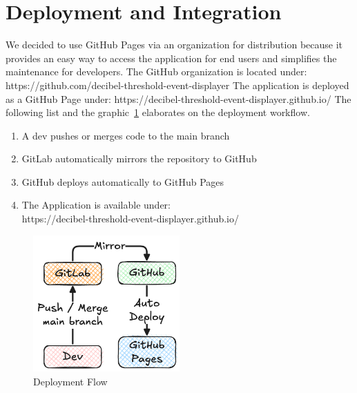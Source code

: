 \section{Deployment and Integration}\label{sec:deployment-and-integration}
We decided to use GitHub Pages via an organization for distribution because it provides an easy way to access the
application for end users and simplifies the maintenance for developers.
The GitHub organization is located under: https://github.com/decibel-threshold-event-displayer
The application is deployed as a GitHub Page under: https://decibel-threshold-event-displayer.github.io/
The following list and the graphic~\ref{fig:deployment_flow} elaborates on the deployment workflow.

\begin{enumerate}
    \item A dev pushes or merges code to the main branch
    \item GitLab automatically mirrors the repository to GitHub
    \item GitHub deploys automatically to GitHub Pages
    \item {The Application is available under: \\
    https://decibel-threshold-event-displayer.github.io/}
\end{enumerate}

\begin{figure}[H]
    \centering
    \includegraphics[width=0.5\textwidth]{../assets/deployment_and_distribution.png}
    \caption{Deployment Flow}\label{fig:deployment_flow}
\end{figure}

